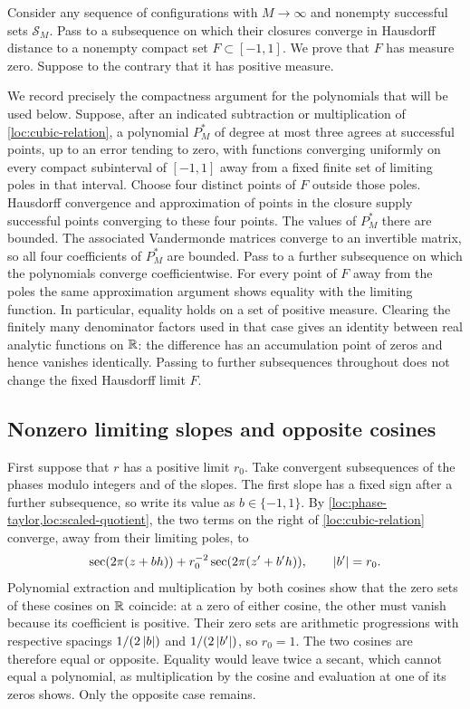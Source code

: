 Consider any sequence of configurations with $M\to\infty$ and
nonempty successful sets $\mathcal S_M$. Pass to a subsequence on
which their closures converge in Hausdorff distance to a nonempty
compact set $F\subset[-1,1]$. We prove that $F$ has measure zero.
Suppose to the contrary that it has positive measure.

We record precisely the compactness argument for the polynomials
that will be used below. Suppose, after an indicated subtraction
or multiplication of \cref{loc:cubic-relation}, a polynomial $P_M^*$
of degree at most three agrees at successful points, up to an error
tending to zero, with functions converging uniformly on every compact
subinterval of $[-1,1]$ away from a fixed finite set of limiting poles
in that interval. Choose four
distinct points of $F$ outside those poles. Hausdorff convergence
and approximation of points in the closure supply successful points
converging to these four points. The values of $P_M^*$ there are
bounded. The associated Vandermonde matrices converge to an invertible
matrix, so all four coefficients of $P_M^*$ are bounded. Pass to a
further subsequence on which the polynomials converge coefficientwise.
For every point of $F$ away from the poles the same approximation
argument shows equality with the limiting function. In particular,
equality holds on a set of positive measure. Clearing the finitely
many denominator factors used in that case gives an identity between
real analytic functions on $\mathbb{R}$: the difference has an accumulation
point of zeros and hence vanishes identically. Passing to further
subsequences throughout does not change the fixed Hausdorff limit $F$.

\subsection{Nonzero limiting slopes and opposite cosines}

First suppose that $r$ has a positive limit $r_0$. Take convergent
subsequences of the phases modulo integers and of the slopes. The
first slope has a fixed sign after a further subsequence, so write
its value as $b\in\{-1,1\}$. By
\cref{loc:phase-taylor,loc:scaled-quotient}, the two terms on the
right of \cref{loc:cubic-relation} converge, away from their limiting
poles, to
\[
 \sec(2\pi(z+bh))+
 r_0^{-2}\sec(2\pi(z'+b'h)),\qquad \left\lvert b'\right\rvert=r_0.
\]
Polynomial extraction and multiplication by both cosines show that
the zero sets of these cosines on $\mathbb{R}$ coincide: at a zero of either
cosine, the other must vanish because its coefficient is positive.
Their zero sets are arithmetic progressions with respective spacings
$1/(2\left\lvert b\right\rvert)$ and $1/(2\left\lvert b'\right\rvert)$, so $r_0=1$.
The two cosines are therefore equal or opposite. Equality would leave
twice a secant, which cannot equal a polynomial, as multiplication by
the cosine and evaluation at one of its zeros shows. Only the opposite
case remains.

